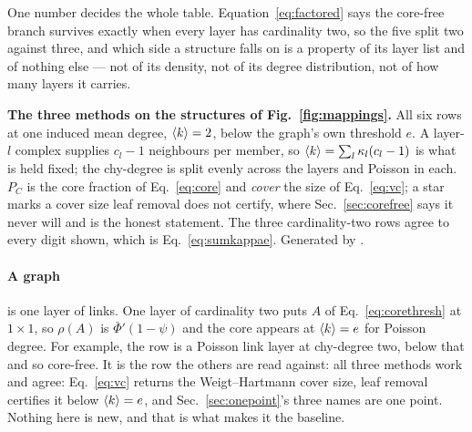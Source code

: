 One number decides the whole table. Equation~\eqref{eq:factored} says the
core-free branch survives exactly when every layer has cardinality two, so the
five split two against three, and which side a structure falls on is a property
of its layer list and of nothing else --- not of its density, not of its degree
distribution, not of how many layers it carries.

\begin{table}[t]
\centering\small
\begin{adjustbox}{max width=\linewidth}

\end{adjustbox}
\caption{\textbf{The three methods on the structures of
Fig.~\ref{fig:mappings}.} All six rows at one induced mean degree,
$\ave{k}=2$, below the graph's own threshold $e$. A layer-$l$ complex supplies
$c_{l}-1$ neighbours per member, so $\ave{k}=\sum_{l}\kappa_{l}(c_{l}-1)$ is
what is held fixed; the chy-degree is split evenly across the layers and
Poisson in each. $P_{C}$ is the core fraction of Eq.~\eqref{eq:core} and
\emph{cover} the size of Eq.~\eqref{eq:vc}; a star marks a cover size leaf
removal does not certify, where Sec.~\ref{sec:corefree} says it never will and
 is the honest statement. The three
cardinality-two rows agree to every digit shown, which is
Eq.~\eqref{eq:sumkappae}. Generated by
.}
\label{tab:five}
\end{table}

\paragraph{A graph} is one layer of links. One layer of cardinality two puts
$A$ of Eq.~\eqref{eq:corethresh} at $1\times1$, so $\rho(A)$ is
$\bar\Phi'(1-\psi)$ and the core appears at $\langle k \rangle=e$ for Poisson degree.
For example, the row is a Poisson link layer at chy-degree two, below that and
so core-free. It is the row the others are read against: all three methods
work and agree: Eq.~\eqref{eq:vc} returns the Weigt--Hartmann cover size, leaf
removal certifies it below $\langle k \rangle=e$, and Sec.~\ref{sec:onepoint}'s three
names are one point. Nothing here is new, and that is what makes it the
baseline.

